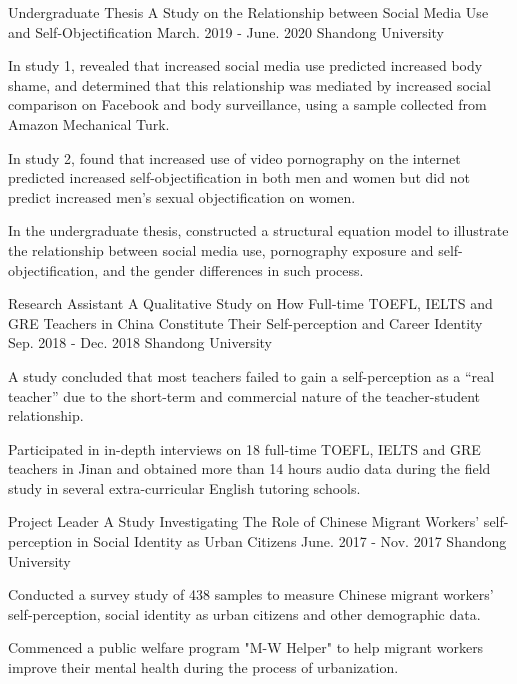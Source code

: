 \begin{cventries}
    \cventry
    {Undergraduate Thesis} %
    {A Study on the Relationship between Social Media Use and Self-Objectification} %
    {March. 2019 - June. 2020} %
    {Shandong University} %
    {
      \begin{cvitems} %
        \item {In study 1, revealed that increased social media use predicted increased body shame, and determined that this relationship was mediated by increased social comparison on Facebook and body surveillance, using a sample collected from Amazon Mechanical Turk.}
        \item {In study 2, found that increased use of video pornography on the internet predicted increased self-objectification in both men and women but did not predict increased men’s sexual objectification on women.}
        \item {In the undergraduate thesis, constructed a structural equation model to illustrate the relationship between social media use, pornography exposure and self-objectification, and the gender differences in such process.}
      \end{cvitems}
    }
    
    \cventry
    {Research Assistant} %
    {A Qualitative Study on How Full-time TOEFL, IELTS and GRE Teachers in China Constitute Their Self-perception and Career Identity} %
    {Sep. 2018 - Dec. 2018} %
    {Shandong University} %
    {
      \begin{cvitems} %
        \item {A study concluded that most teachers failed to gain a self-perception as a “real teacher” due to the short-term and commercial nature of the teacher-student relationship.}
        \item {Participated in in-depth interviews on 18 full-time TOEFL, IELTS and GRE teachers in Jinan and obtained more than 14 hours audio data during the field study in several extra-curricular English tutoring schools.}
      \end{cvitems}
    }
    
    
    \cventry
    {Project Leader} %
    {A Study Investigating The Role of Chinese Migrant Workers' self-perception in Social Identity as Urban Citizens} %
    {June. 2017 - Nov. 2017} %
    {Shandong University} %
    {
      \begin{cvitems} %
        \item {Conducted a survey study of 438 samples to measure Chinese migrant workers' self-perception, social identity as urban citizens and other demographic data.}
        \item {Commenced a public welfare program "M-W Helper" to help migrant workers improve their mental health during the process of urbanization.}
      \end{cvitems}
    }
    

\end{cventries}
